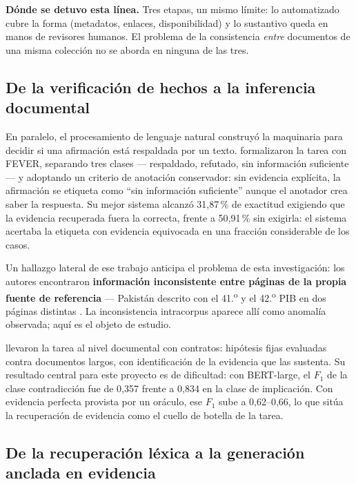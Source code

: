 \begin{estado}
\small
\textbf{Dónde se detuvo esta línea.} Tres etapas, un mismo límite: lo automatizado
cubre la forma (metadatos, enlaces, disponibilidad) y lo sustantivo queda en manos de
revisores humanos. El problema de la consistencia \emph{entre} documentos de una
misma colección no se aborda en ninguna de las tres.
\end{estado}

\subsection{De la verificación de hechos a la inferencia documental}
\label{sec:ant-verificacion}

En paralelo, el procesamiento de lenguaje natural construyó la maquinaria para
decidir si una afirmación está respaldada por un texto. \textcite{thorne2018fever}
formalizaron la tarea con FEVER, separando tres clases --- respaldado, refutado, sin
información suficiente --- y adoptando un criterio de anotación conservador: sin
evidencia explícita, la afirmación se etiqueta como \enquote{sin información
suficiente} aunque el anotador crea saber la respuesta. Su mejor sistema alcanzó
31,87\,\% de exactitud exigiendo que la evidencia recuperada fuera la correcta, frente
a 50,91\,\% sin exigirla: el sistema acertaba la etiqueta con evidencia equivocada en
una fracción considerable de los casos.

Un hallazgo lateral de ese trabajo anticipa el problema de esta investigación: los
autores encontraron \textbf{información inconsistente entre páginas de la propia
fuente de referencia} --- Pakistán descrito con el 41.\textsuperscript{o} y el
42.\textsuperscript{o} PIB en dos páginas distintas
\parencite[p.~8]{thorne2018fever}. La inconsistencia intracorpus aparece allí como
anomalía observada; aquí es el objeto de estudio.

\textcite{koreeda2021contractnli} llevaron la tarea al nivel documental con
contratos: hipótesis fijas evaluadas contra documentos largos, con identificación de
la evidencia que las sustenta. Su resultado central para este proyecto es de
dificultad: con BERT-large, el $F_1$ de la clase contradicción fue de 0,357 frente a
0,834 en la clase de implicación. Con evidencia perfecta provista por un oráculo, ese
$F_1$ sube a 0,62--0,66, lo que sitúa la recuperación de evidencia como el cuello de
botella de la tarea.

\subsection{De la recuperación léxica a la generación anclada en evidencia}
\label{sec:ant-rag}

